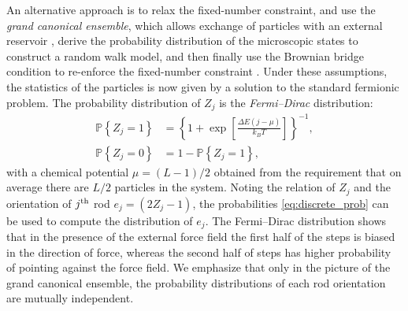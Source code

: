 \documentclass[aps,showpacs,twocolumn,floatfix,prx,superscriptaddress]{revtex4-1}
\begin{document}
An alternative approach is to relax the fixed-number constraint, and use
the \emph{grand canonical ensemble}, which allows exchange of particles with
an external reservoir \cite{Chandler1987,Huang2001}, derive the probability
distribution of the microscopic states to construct a random walk model, and
then finally use the Brownian bridge condition to re-enforce the fixed-number constraint
\cite{Lin2015}. Under these assumptions, the statistics of the particles is now given by a solution to the standard fermionic problem.
The probability distribution of $Z_j$  is the {\em Fermi--Dirac} distribution:
\cite{Chandler1987,Lin2015}
\begin{subequations}
    \begin{align}
        \label{eq:discrete_prob}
        \mathbb{P} \left\{ Z_j = 1\right\} & =  \left\{1+\exp\left[\frac{ \Delta
                    E \left(j - \mu \right) }{k_B T}\right]\right\}^{-1}, \\
        \mathbb{P} \left\{ Z_j = 0\right\} & = 1 - \mathbb{P} \left\{ Z_j =
            1\right\},
    \end{align}
\end{subequations}
with a chemical potential $\mu = (L-1)/2$ obtained from the requirement that on average there are $L/2$ particles in the system.
Noting the relation of $Z_j$ and the orientation of $j^{\rm
    th}$ rod $e_j = \left(2Z_j -1\right)$, the probabilities
\eqref{eq:discrete_prob} can be used to compute the distribution of $e_j$. The Fermi--Dirac distribution shows that in the presence of the external force field the first half of the steps is biased in the direction of force, whereas the second half of steps has higher probability of pointing against the force field.
We emphasize that only in the
picture of the grand canonical ensemble, the probability distributions of each rod orientation
are mutually independent.%
\end{document}
